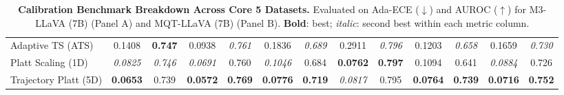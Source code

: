 \begin{table}[t]
{\begin{tabular}{l cccccccccccc}
Adaptive TS (ATS) & 0.1408 & \textbf{0.747} & 0.0938 & \textit{0.761} & 0.1836 & \textit{0.689} & 0.2911 & \textit{0.796} & 0.1203 & \textit{0.658} & 0.1659 & \textit{0.730} \\
Platt Scaling (1D) & \textit{0.0825} & \textit{0.746} & \textit{0.0691} & 0.760 & \textit{0.1046} & 0.684 & \textbf{0.0762} & \textbf{0.797} & 0.1094 & 0.641 & \textit{0.0884} & 0.726 \\
Trajectory Platt (5D) & \textbf{0.0653} & 0.739 & \textbf{0.0572} & \textbf{0.769} & \textbf{0.0776} & \textbf{0.719} & \textit{0.0817} & 0.795 & \textbf{0.0764} & \textbf{0.739} & \textbf{0.0716} & \textbf{0.752} \\
\bottomrule
\end{tabular}%
}
\caption{\textbf{Calibration Benchmark Breakdown Across Core 5 Datasets.} Evaluated on Ada-ECE ($\downarrow$) and AUROC ($\uparrow$) for M3-LLaVA (7B) (Panel A) and MQT-LLaVA (7B) (Panel B). \textbf{Bold}: best; \textit{italic}: second best within each metric column.}
\label{tab:core7_benchmark_breakdown}
\end{table}
